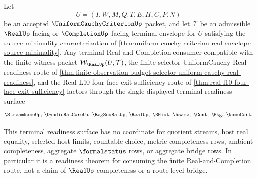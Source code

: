 \begin{theorem}
\label{thm:uniform-cauchy-criterion-real-completion-terminal-readiness}
Let
$$
U=(I,W,M,Q,T,E,H,C,P,N)
$$
be an accepted $\UniformCauchyCriterionUp$ packet, and let $\mathcal{T}$ be an admissible $\RealUp$-facing or $\CompletionUp$-facing terminal envelope for $U$ satisfying the source-minimality characterization of \autoref{thm:uniform-cauchy-criterion-real-envelope-source-minimality}. Any terminal Real-and-Completion consumer compatible with the finite witness packet $\mathcal{W}_{\RealUp}(U,\mathcal{T})$, the finite-selector UniformCauchy Real readiness route of \autoref{thm:finite-observation-budget-selector-uniform-cauchy-real-readiness}, and the Real L10 four-face exit sufficiency route of \autoref{thm:real-l10-four-face-exit-sufficiency} factors through the single displayed terminal readiness surface
$$
\StreamNameUp,\ \DyadicRatCoreUp,\ \RegSeqRatUp,\ \RealUp,\ \BHist,\ \hsame,\ \Cont,\ \Pkg,\ \NameCert.
$$

This terminal readiness surface has no coordinate for quotient streams, host real equality, selected host limits, countable choice, metric-completeness rows, ambient completeness, aggregate $\formalstatus$ rows, or aggregate bridge rows. In particular it is a readiness theorem for consuming the finite Real-and-Completion route, not a claim of $\RealUp$ completeness or a route-level bridge.
\end{theorem}
